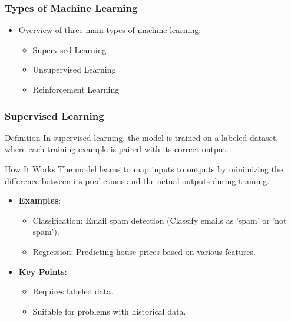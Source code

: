 \documentclass[aspectratio=169]{beamer}
\begin{document}
\begin{frame}[fragile]
    \frametitle{Types of Machine Learning}
    \begin{itemize}
        \item Overview of three main types of machine learning:
        \begin{itemize}
            \item Supervised Learning
            \item Unsupervised Learning
            \item Reinforcement Learning
        \end{itemize}
    \end{itemize}
\end{frame}

\begin{frame}[fragile]
    \frametitle{Supervised Learning}
    \begin{block}{Definition}
        In supervised learning, the model is trained on a labeled dataset, where each training example is paired with its correct output.
    \end{block}
    
    \begin{block}{How It Works}
        The model learns to map inputs to outputs by minimizing the difference between its predictions and the actual outputs during training.
    \end{block}
    
    \begin{itemize}
        \item \textbf{Examples}:
        \begin{itemize}
            \item Classification: Email spam detection (Classify emails as 'spam' or 'not spam').
            \item Regression: Predicting house prices based on various features.
        \end{itemize}
        \item \textbf{Key Points}:
        \begin{itemize}
            \item Requires labeled data.
            \item Suitable for problems with historical data.
        \end{itemize}
    \end{itemize}
\end{frame}
\end{document}

